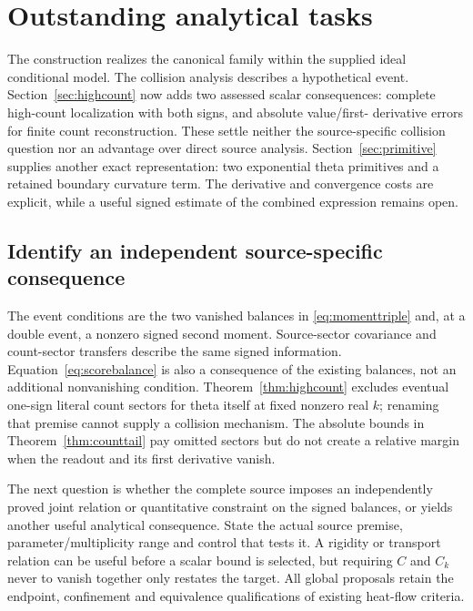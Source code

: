 \section{Outstanding analytical tasks}\label{sec:outstanding}

The construction realizes the canonical family within the supplied ideal
conditional model. The collision analysis describes a hypothetical event.
Section~\ref{sec:highcount} now adds two assessed scalar consequences:
complete high-count localization with both signs, and absolute value/first-
derivative errors for finite count reconstruction. These settle neither
the source-specific collision question nor an advantage over direct source
analysis. Section~\ref{sec:primitive} supplies another exact representation:
two exponential theta primitives and a retained boundary curvature term.
The derivative and convergence costs are explicit, while a useful signed
estimate of the combined expression remains open.

\subsection{Identify an independent source-specific consequence}
The event conditions are the two vanished balances in
\eqref{eq:momenttriple} and, at a double event, a nonzero signed second
moment. Source-sector covariance and count-sector transfers describe the
same signed information. Equation~\eqref{eq:scorebalance} is also a
consequence of the existing balances, not an additional nonvanishing
condition. Theorem~\ref{thm:highcount} excludes eventual one-sign literal
count sectors for theta itself at fixed nonzero real $k$; renaming that
premise cannot supply a collision mechanism. The absolute bounds in
Theorem~\ref{thm:counttail} pay omitted sectors but do not create a
relative margin when the readout and its first derivative vanish.

The next question is whether the complete source imposes an independently
proved joint relation or quantitative constraint on the signed balances,
or yields another useful analytical consequence. State the actual source
premise, parameter/multiplicity range and control that tests it. A rigidity
or transport relation can be useful before a scalar bound is selected,
but requiring $C$ and $C_k$ never to vanish together only restates the
target. All global proposals retain the endpoint, confinement and
equivalence qualifications of existing heat-flow criteria.

